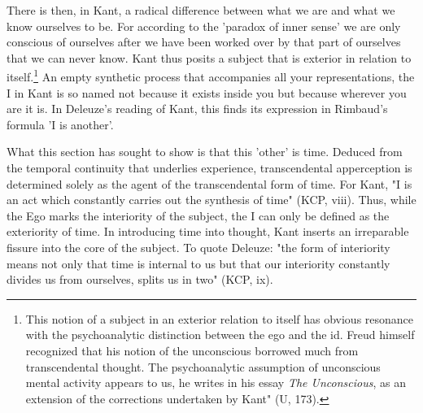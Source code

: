 There is then, in Kant, a radical difference between what we are and what we know ourselves to be. For according to the 'paradox of inner sense' we are only conscious of ourselves after we have been worked over by that part of ourselves that we can never know. Kant thus posits a subject that is exterior in relation to itself.\footnote{This notion of a subject in an exterior relation to itself has obvious resonance with the psychoanalytic distinction between the ego and the id. Freud himself recognized that his notion of the unconscious borrowed much from transcendental thought. The psychoanalytic assumption of unconscious mental activity appears to us, he writes in his essay \textit{The Unconscious}, as an extension of the corrections undertaken by Kant" (U, 173).} An empty synthetic process that accompanies all your representations, the I in Kant is so named not because it exists inside you but because wherever you are it is. In Deleuze's reading of Kant, this finds its expression in Rimbaud's formula 'I is another'.

What this section has sought to show is that this 'other' is time. Deduced from the temporal continuity that underlies experience, transcendental apperception is determined solely as the agent of the transcendental form of time. For Kant, "I is an act which constantly carries out the synthesis of time" (KCP, viii). Thus, while the Ego marks the interiority of the subject, the I can only be defined as the exteriority of time. In introducing time into thought, Kant inserts an irreparable fissure into the core of the subject. To quote Deleuze: "the form of interiority means not only that time is internal to us but that our interiority constantly divides us from ourselves, splits us in two" (KCP, ix).

